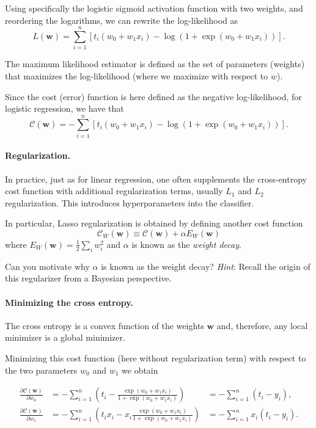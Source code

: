 \documentclass[%
oneside,                 %
final,                   %
10pt]{article}
\newenvironment{question_mdfboxadmon}[1][]{
\begin{question_mdfboxmdframed}[frametitle=#1]
}
{
\end{question_mdfboxmdframed}
}
\begin{document}
Using specifically the logistic sigmoid activation function with two weights, and reordering the logarithms, we can rewrite the log-likelihood as
\[
L(\boldsymbol{w}) = \sum_{i=1}^n  \left[ t_i(w_0+w_1 x_i) -\log{(1+\exp{(w_0+w_1x_i)})} \right].
\]

The maximum likelihood estimator is defined as the set of parameters (weights) that maximizes the log-likelihood (where we maximize with respect to $w$).

Since the cost (error) function is here defined as the negative log-likelihood, for logistic regression, we have that
\[
\mathcal{C}(\boldsymbol{w})=-\sum_{i=1}^n  \left[ t_i (w_0+w_1x_i) -\log{ \left( 1+\exp{(w_0+w_1x_i)} \right) } \right].
\]

\paragraph{Regularization.}
In practice, just as for linear regression, one often supplements the cross-entropy cost function with additional regularization terms, usually $L_1$ and $L_2$ regularization. This introduces hyperparameters into the classifier.

In particular, Lasso regularization is obtained by defining another cost function
\[
\mathcal{C}_W (\boldsymbol{w}) \equiv \mathcal{C} (\boldsymbol{w}) + \alpha E_W (\boldsymbol{w})
\]
where $E_W (\boldsymbol{w}) = \frac{1}{2} \sum_i w_i^2$ and $\alpha$ is known as the \emph{weight decay}.


\begin{question_mdfboxadmon}[Question]
Can you motivate why $\alpha$ is known as the weight decay? \emph{Hint}: Recall the origin of this regularizer from a Bayesian perspective.
\end{question_mdfboxadmon} %




\paragraph{Minimizing the cross entropy.}
The cross entropy is a convex function of the weights $\boldsymbol{w}$ and,
therefore, any local minimizer is a global minimizer. 


Minimizing this cost function (here without regularization term) with respect to the two parameters $w_0$ and $w_1$ we obtain

\begin{align*}
\frac{\partial \mathcal{C}(\boldsymbol{w})}{\partial w_0} 
&= -\sum_{i=1}^n  \left(t_i -\frac{\exp{(w_0+w_1x_i)}}{1+\exp{(w_0+w_1x_i)}}\right)
&= -\sum_{i=1}^n  \left(t_i - y_i \right), \\
\frac{\partial \mathcal{C}(\boldsymbol{w})}{\partial w_1} 
&= -\sum_{i=1}^n  \left(t_i x_i -x_i\frac{\exp{(w_0+w_1x_i)}}{1+\exp{(w_0+w_1x_i)}}\right)
&= -\sum_{i=1}^n  x_i \left(t_i - y_i \right).
\end{align*}
\end{document}

